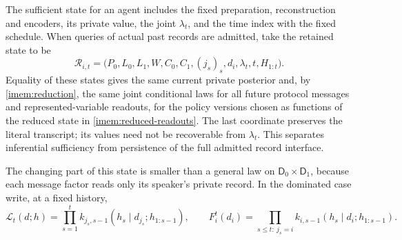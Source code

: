 The sufficient state for an agent includes the fixed preparation, reconstruction and encoders, its private value, the joint $\lambda_t$, and the time index with the fixed schedule. When queries of actual past records are admitted, take the retained state to be
\begin{equation}
 \mathcal R_{i,t}
 =\bigl(P_0,L_0,L_1,W,C_0,C_1,(j_s)_s,d_i,\lambda_t,t,H_{1:t}\bigr).
 \label{imem:retention}
\end{equation}
Equality of these states gives the same current private posterior and, by \cref{imem:reduction}, the same joint conditional laws for all future protocol messages and represented-variable readouts, for the policy versions chosen as functions of the reduced state in \cref{imem:reduced-readouts}. The last coordinate preserves the literal transcript; its values need not be recoverable from $\lambda_t$. This separates inferential sufficiency from persistence of the full admitted record interface.

The changing part of this state is smaller than a general law on $\mathsf D_0\times\mathsf D_1$, because each message factor reads only its speaker's private record. In the dominated case write, at a fixed history,
\begin{equation}
 \mathcal L_t(d;h)=\prod_{s=1}^tk_{j_s,s-1}(h_s\mid d_{j_s};h_{1:s-1}),\qquad
 F_i^t(d_i)=\prod_{s\leq t:\ j_s=i}k_{i,s-1}(h_s\mid d_i;h_{1:s-1}).
 \label{imem:evidence-factors}
\end{equation}

